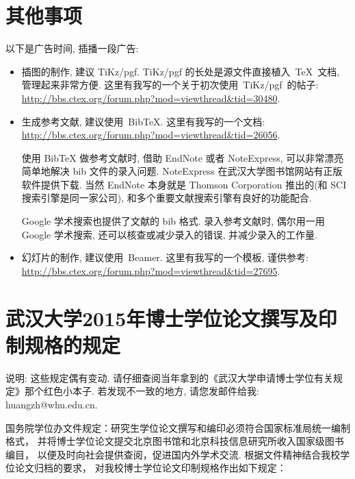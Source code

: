 \documentclass{WHUPhd}  %
\begin{document}
\chapter{其他事项}
以下是广告时间, 插播一段广告:
\begin{itemize}
    \item 插图的制作, 建议 TiKz/pgf.
          TiKz/pgf 的长处是源文件直接植入~\TeX~文档, 管理起来非常方便.
    这里有我写的一个关于初次使用~TiKz/pgf~的帖子:\\    \url{http://bbs.ctex.org/forum.php?mod=viewthread&tid=30480}.
    \item 生成参考文献, 建议使用~BibTeX.  这里有我写的一个文档: \\
    \url{http://bbs.ctex.org/forum.php?mod=viewthread&tid=26056}.

      {\kaishu 使用 BibTeX{} 做参考文献时,
      借助 EndNote 或者 NoteExpress, 可以非常漂亮简单地解决 bib 文件的录入问题.
      NoteExpress 在武汉大学图书馆网站有正版软件提供下载.
      当然 EndNote 本身就是 Thomson Corporation 推出的(和 SCI 搜索引擎是同一家公司),
      和多个重要文献搜索引擎有良好的功能配合.

      Google 学术搜索也提供了文献的 bib 格式.
      录入参考文献时, 偶尔用一用 Google 学术搜索, 还可以核查或减少录入的错误, 并减少录入的工作量.}
     \item 幻灯片的制作, 建议使用~Beamer. 这里有我写的一个模板, 谨供参考:\\
    \url{http://bbs.ctex.org/forum.php?mod=viewthread&tid=27695}.

\end{itemize}

\chapter{武汉大学2015年博士学位论文撰写及印制规格的规定}


{ {\heiti 说明}: \kaishu
 这些规定偶有变动.
 请仔细查阅当年拿到的《武汉大学申请博士学位有关规定》那个红色小本子.
 若发现不一致的地方, 请您发邮件给我: huangzh@whu.edu.cn.}

\bigskip




国务院学位办文件规定：研究生学位论文撰写和编印必须符合国家标准局统一编制格式，
并将博士学位论文提交北京图书馆和北京科技信息研究所收入国家级图书编目，
以便及时向社会提供查阅，促进国内外学术交流. 根据文件精神结合我校学位论文归档的要求，
对我校博士学位论文印制规格作出如下规定：
\end{document}
